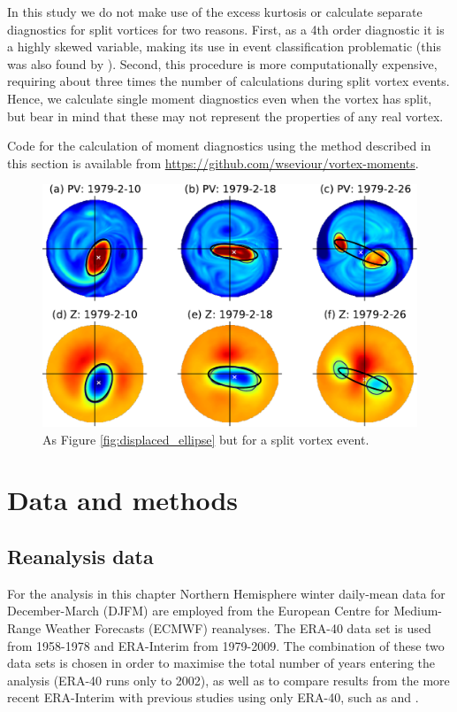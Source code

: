 In this study we do not make use of the excess kurtosis or calculate separate
diagnostics for split vortices for two reasons. First, as a 4th order diagnostic
it is a highly skewed variable, making its use in event classification
problematic (this was also found by \citet{Hannachi2010}). Second, this
procedure is more computationally expensive, requiring about three times the
number of calculations during split vortex events. Hence, we calculate single
moment diagnostics even when the vortex has split, but bear in mind that these
may not represent the properties of any real vortex. 

Code for the calculation of moment diagnostics using the method described
in this section is available from
\url{https://github.com/wseviour/vortex-moments}.

\begin{figure}
 \centering
 \noindent\includegraphics[width=\textwidth]{figures/chapter-moments/PV_GPH_1979.pdf}
 \caption[Equivalent ellipse for a spit vortex event.]{As Figure
   \ref{fig:displaced_ellipse} but for a split vortex event.}
 \label{fig:split_ellipse}
\end{figure}


\section{Data and methods}
\label{sec:methodology}

\subsection{Reanalysis data}
\label{sec:reanalysis-data}
For the analysis in this chapter Northern Hemisphere winter daily-mean data for
December-March (DJFM) are employed from the European Centre for Medium-Range
Weather Forecasts (ECMWF) reanalyses. The ERA-40 data set \citep{Uppala2005} is
used from 1958-1978 and ERA-Interim \citep{Dee2011} from 1979-2009. The
combination of these two data sets is chosen in order to maximise the total
number of years entering the analysis (ERA-40 runs only to 2002), as well as to
compare results from the more recent ERA-Interim with previous studies using
only ERA-40, such as \citet{Charlton2007} and \citet{Mitchell2013}.

